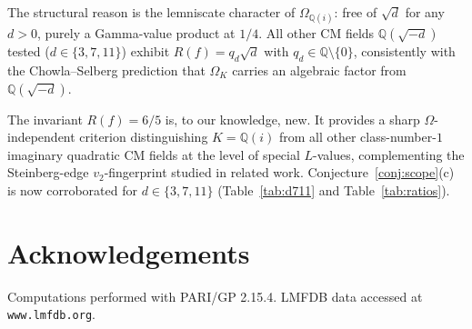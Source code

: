 \documentclass[10pt]{article}
\theoremstyle{definition}
\newcommand{\Q}{\mathbb{Q}}
\begin{document}
The structural reason is the lemniscate character of $\Omega_{\Q(i)}$: free of $\sqrt{d}$
for any $d > 0$, purely a Gamma-value product at $1/4$.  All other CM fields
$\Q(\sqrt{-d})$ tested ($d \in \{3, 7, 11\}$) exhibit $R(f) = q_d\sqrt{d}$
with $q_d \in \Q\setminus\{0\}$, consistently with the Chowla--Selberg prediction
that $\Omega_K$ carries an algebraic factor from $\Q(\sqrt{-d})$.

The invariant $R(f) = 6/5$ is, to our knowledge, new.  It provides a sharp
$\Omega$-independent criterion distinguishing $K = \Q(i)$ from all other class-number-$1$
imaginary quadratic CM fields at the level of special $L$-values, complementing
the Steinberg-edge $v_2$-fingerprint studied in related work.
Conjecture~\ref{conj:scope}(c) is now corroborated for $d \in \{3, 7, 11\}$
(Table~\ref{tab:d711} and Table~\ref{tab:ratios}).


\section*{Acknowledgements}

Computations performed with PARI/GP 2.15.4.  LMFDB data accessed at
\texttt{www.lmfdb.org}.
\end{document}

